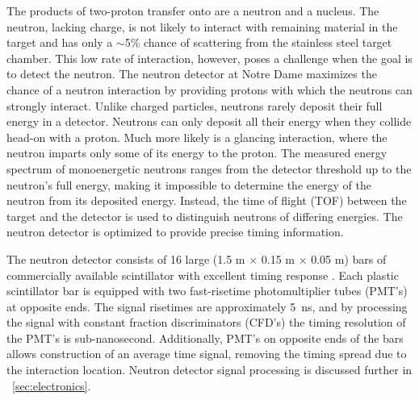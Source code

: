 The products of two-proton transfer onto \GeTargets are a neutron and a \SeProducts nucleus.  The neutron, lacking charge, is not likely to interact with remaining material in the target and has only a $\sim$5\% chance of scattering from the stainless steel target chamber.  This low rate of interaction, however, poses a challenge when the goal is to detect the neutron.  The neutron detector at Notre Dame maximizes the chance of a neutron interaction by providing protons with which the neutrons can strongly interact.  Unlike charged particles, neutrons rarely deposit their full energy in a detector.  Neutrons can only deposit all their energy when they collide head-on with a proton.  Much more likely is a glancing interaction, where the neutron imparts only some of its energy to the proton.  The measured energy spectrum of monoenergetic neutrons ranges from the detector threshold up to the neutron's full energy, making it impossible to determine the energy of the neutron from its deposited energy.  Instead, the time of flight (TOF) between the target and the detector is used to distinguish neutrons of differing energies.  The neutron detector is optimized to provide precise timing information.       

The neutron detector \citep{KolataNeutwall} consists of 16 large (1.5 m $\times$ 0.15 m $\times$ 0.05 m) bars of commercially available scintillator with excellent timing response \citep{BC408}.  Each plastic scintillator bar is equipped with two fast-risetime photomultiplier tubes (PMT's) at opposite ends.  The signal risetimes are approximately 5~ns, and by processing the signal with constant fraction discriminators (CFD's) the timing resolution of the PMT's is sub-nanosecond.  Additionally, PMT's on opposite ends of the bars allows construction of an average time signal, removing the timing spread due to the interaction location.  Neutron detector signal processing is discussed further in {\sect}~\ref{sec:electronics}.

